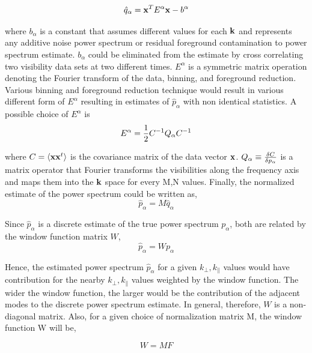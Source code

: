 \documentclass[twocolumn]{emulateapj}
\begin{document}
\begin{equation}
\hat q_{\alpha} = \bold x^{T} E^{\alpha} \bold x  - b^{\alpha}
\label{eq15}
\end{equation}

where $b_{\alpha}$ is a constant that assumes different values for each $\bold k$ and represents any additive noise power spectrum or residual foreground contamination to power spectrum estimate. $b_{\alpha}$ could be eliminated from the estimate by cross correlating two visibility data sets at two different times. $E^{\alpha}$ is a symmetric matrix operation denoting the Fourier transform of the data, binning, and foreground reduction. Various binning and foreground reduction technique would result in various different form of $E^{\alpha}$ resulting in estimates of $\hat p_{\alpha}$ with non identical statistics. A possible choice of $E^{\alpha}$ is
\begin{equation}
E^{\alpha} =  {1 \over 2} C^{-1} Q_{\alpha} C^{-1}
\label{eq16}
\end{equation} 

where $C = \langle \bold x \bold x^{t} \rangle$ is the covariance matrix of the data vector $\bold x$. $Q_{\alpha} \equiv {\delta C \over \delta p_{\alpha} } $ is a matrix operator that Fourier transforms the visibilities along the frequency axis and maps them into the $\bold k$ space for every M,N values. Finally, the normalized estimate of the power spectrum could be written as,  
\begin{equation}
\hat p_{\alpha} = M \hat q_{\alpha} 
\label{eq17}
\end{equation} 

Since $\hat p_{\alpha}$ is a discrete estimate of the true power spectrum $p_{\alpha}$, both are related by the window function matrix $W$, 
\begin{equation}
\hat p_{\alpha} = W p_{\alpha}
\label{eq18}
\end{equation} 

Hence, the estimated power spectrum $\hat p_{\alpha}$ for a given $k_{\perp}, k_{\parallel}$ values would have contribution for the nearby $k_{\perp}, k_{\parallel}$ values weighted by the window function. The wider the window function, the larger would be the contribution of the adjacent modes to the discrete power spectrum estimate. In general, therefore, $W$ is a non-diagonal matrix. Also, for a given choice of normalization matrix M, the window function W will be, 

\begin{equation}
 W = MF
 \label{eq19}
\end{equation} 
\end{document}

